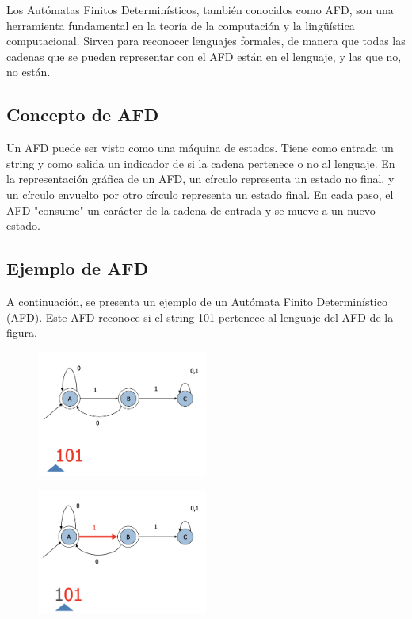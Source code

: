 \documentclass[11pt]{article}
\begin{document}
    Los Autómatas Finitos Determinísticos, también conocidos como AFD, son una herramienta fundamental en la teoría de la computación y la lingüística computacional. Sirven para reconocer lenguajes formales, de manera que todas las cadenas que se pueden representar con el AFD están en el lenguaje, y las que no, no están.

    \subsection{Concepto de AFD}

    Un AFD puede ser visto como una máquina de estados. Tiene como entrada un string y como salida un indicador de si la cadena pertenece o no al lenguaje. En la representación gráfica de un AFD, un círculo representa un estado no final, y un círculo envuelto por otro círculo representa un estado final. En cada paso, el AFD "consume" un carácter de la cadena de entrada y se mueve a un nuevo estado.

    \subsection{Ejemplo de AFD}

    A continuación, se presenta un ejemplo de un Autómata Finito Determinístico (AFD). Este AFD reconoce si el string 101 pertenece al lenguaje del AFD de la figura.

    \begin{figure}[H]
        \centering
        \includegraphics[width=0.5\textwidth]{img/afd/afd-1}\label{fig:figure}
    \end{figure}

    \begin{figure}[H]
        \centering
        \includegraphics[width=0.5\textwidth]{img/afd/afd-2}\label{fig:figure2}
    \end{figure}
\end{document}

